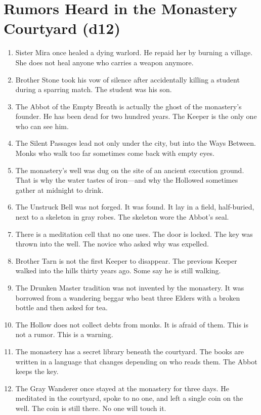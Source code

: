 \documentclass[11pt]{book}
\begin{document}
\chapter{Rumors Heard in the Monastery Courtyard (d12)}

\begin{enumerate}
    \item Sister Mira once healed a dying warlord. He repaid her by burning a village. She does not heal anyone who carries a weapon anymore.
    \item Brother Stone took his vow of silence after accidentally killing a student during a sparring match. The student was his son.
    \item The Abbot of the Empty Breath is actually the ghost of the monastery's founder. He has been dead for two hundred years. The Keeper is the only one who can see him.
    \item The Silent Passages lead not only under the city, but into the Ways Between. Monks who walk too far sometimes come back with empty eyes.
    \item The monastery's well was dug on the site of an ancient execution ground. That is why the water tastes of iron---and why the Hollowed sometimes gather at midnight to drink.
    \item The Unstruck Bell was not forged. It was found. It lay in a field, half-buried, next to a skeleton in gray robes. The skeleton wore the Abbot's seal.
    \item There is a meditation cell that no one uses. The door is locked. The key was thrown into the well. The novice who asked why was expelled.
    \item Brother Tarn is not the first Keeper to disappear. The previous Keeper walked into the hills thirty years ago. Some say he is still walking.
    \item The Drunken Master tradition was not invented by the monastery. It was borrowed from a wandering beggar who beat three Elders with a broken bottle and then asked for tea.
    \item The Hollow does not collect debts from monks. It is afraid of them. This is not a rumor. This is a warning.
    \item The monastery has a secret library beneath the courtyard. The books are written in a language that changes depending on who reads them. The Abbot keeps the key.
    \item The Gray Wanderer once stayed at the monastery for three days. He meditated in the courtyard, spoke to no one, and left a single coin on the well. The coin is still there. No one will touch it.
\end{enumerate}
\end{document}
